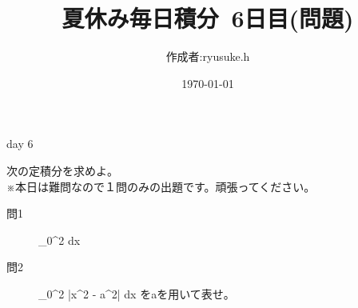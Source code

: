 \documentclass[12pt,a4paper]{jsarticle}
\title{夏休み毎日積分~6日目(問題)}
\date{\today}
\begin{document}
\maketitle
\begin{flushright}
    \author{作成者:ryusuke.h}
\end{flushright}
\begin{itembox}[c]{day 6 }
    \begin{center}
        次の定積分を求めよ。\\
        ※本日は難問なので１問のみの出題です。頑張ってください。
    \end{center}
\end{itembox}

\begin{description}
    \item [問1] {\displaystyle}\int_0^2  dx
\end{description}

\begin{description}
    \item [問2] {\displaystyle} \int_0^2 \left|x^2 - a^2\right| dx をaを用いて表せ。\\
\end{description}
\end{document}
